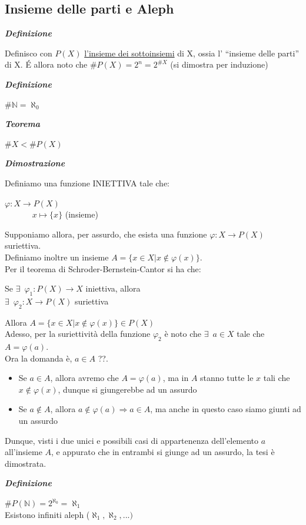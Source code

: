 \documentclass{article}
\theoremstyle{definition}
\newcommand{\virgolette}[1]{``#1''}
\begin{document}
\subsection{Insieme delle parti e Aleph}
\begin{center}
    \textbf{\textit{Definizione}}
\end{center}
Definisco con $P(X)$ \underline{l'insieme dei sottoinsiemi} di X, ossia l' \virgolette{insieme delle parti} di X. \'E allora noto che $\#P(X)=2^n=2^{\#X}$ (si dimostra per induzione)
\begin{center}
    \textbf{\textit{Definizione}}
\end{center}
$\#\mathbb{N}=\aleph_0$
\begin{center}
    \textbf{\textit{Teorema}}
\end{center}
$\#X < \#P(X)$
\begin{center}
    \textbf{\textit{Dimostrazione}}
\end{center}
Definiamo una funzione INIETTIVA tale che:
\begin{center}
    $\varphi : X \to P(X)$
    \\  \,\,\,\,\,\,\,\,\, \,\,\,\,\,\,\, $x \mapsto \{x\}$ (insieme)
\end{center}
Supponiamo allora, per assurdo, che esista una funzione $\varphi: X \to P(X)$ suriettiva.
\\ Definiamo inoltre un insieme $A=\{x \in X | x \notin \varphi(x)\}$.
\\
Per il teorema di Schroder-Bernstein-Cantor si ha che:
\begin{center}
    Se $\exists \,\,\, \varphi_1 : P(X) \to X$ iniettiva, allora
    \\
    $\exists \,\,\, \varphi_2 :  X \to P(X)$ suriettiva
\end{center}
Allora $A=\{x \in X | x \notin \varphi(x)\} \in P(X)$
\\
Adesso, per la suriettività della funzione $\varphi_2$ è noto che $\exists \,\,\, a \in X$ tale che $A=\varphi(a)$.
\\
Ora la domanda è, $a \in A$ ??.
\begin{itemize}
    \item Se $a \in A$, allora avremo che $A = \varphi(a)$, ma in $A$ stanno tutte le $x$ tali che $x \notin \varphi(x)$, dunque si giungerebbe ad un assurdo
    \item Se $a \notin A$, allora $a \notin \varphi(a) \Rightarrow a \in A$, ma anche in questo caso siamo giunti ad un assurdo
\end{itemize}
Dunque, visti i due unici e possibili casi di appartenenza dell'elemento $a$ all'insieme $A$, e appurato che in entrambi si giunge ad un assurdo, la tesi è dimostrata.
\newpage
\begin{center}
    \textbf{\textit{Definizione}}
\end{center}
$\#P(\mathbb{N})=2^{\aleph_0}=\aleph_1$
\\
Esistono infiniti aleph ($\aleph_1,\aleph_2,...)$
\\
\end{document}
